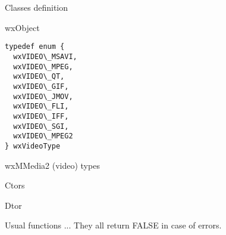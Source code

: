 %
%

\section{}\label{wxvideobasedriver}

Classes definition


wxObject


{\small \begin{verbatim}
typedef enum {
  wxVIDEO\_MSAVI,
  wxVIDEO\_MPEG,
  wxVIDEO\_QT,
  wxVIDEO\_GIF,
  wxVIDEO\_JMOV,
  wxVIDEO\_FLI,
  wxVIDEO\_IFF,
  wxVIDEO\_SGI,
  wxVIDEO\_MPEG2
} wxVideoType
\end{verbatim}}

wxMMedia2 (video) types


\label{wxvideobasedriverwxvideobasedriver}


Ctors


\label{wxvideobasedriverwxvideobasedriver}



\label{wxvideobasedriverwxvideobasedriver}



\label{wxvideobasedriverdtor}


Dtor


\label{wxvideobasedriverplay}


Usual functions ... They all return FALSE in case of errors.


\label{wxvideobasedriverstop}



\label{wxvideobasedriverpause}


